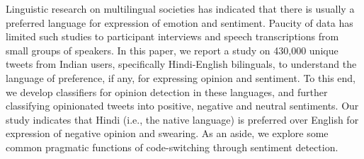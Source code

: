 Linguistic research on multilingual societies has indicated that there is usually a preferred language for expression of emotion and sentiment. Paucity of data has limited such studies to participant interviews and speech transcriptions from small groups of speakers. In this paper, we report a study on 430,000 unique tweets from Indian users, specifically Hindi-English bilinguals, to understand the language of preference, if any, for expressing opinion and sentiment. To this end, we develop classifiers for opinion detection in these languages, and further classifying opinionated tweets into positive, negative and neutral sentiments. Our study indicates that Hindi (i.e., the native language) is preferred over English for expression of negative opinion and swearing. As an aside, we explore some common pragmatic functions of code-switching through sentiment detection.
